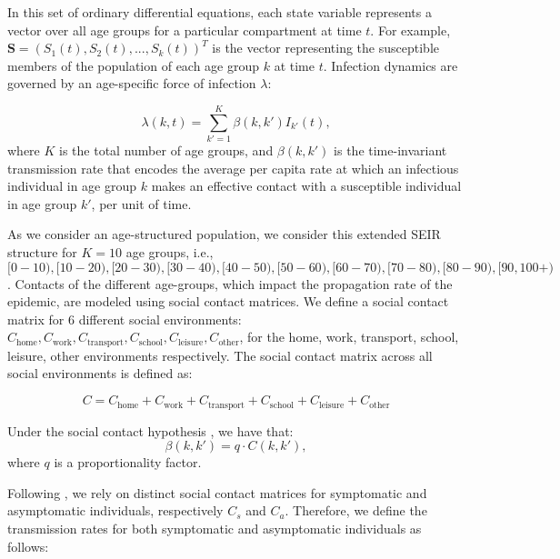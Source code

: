 \documentclass{article}
\renewcommand{\cite}[1]{\citep{#1}}
\newcommand{\foi}{\lambda}
\newcommand{\ctotal}{C}
\newcommand{\chome}{C_{\text{home}}}
\newcommand{\cwork}{C_{\text{work}}}
\newcommand{\ctransport}{C_{\text{transport}}}
\newcommand{\cschool}{C_{\text{school}}}
\newcommand{\cleisure}{C_{\text{leisure}}}
\newcommand{\cother}{C_{\text{other}}}
\newcommand{\proportionalityfactor}{q}
\newcommand{\agegroup}{k}
\newcommand{\agegroups}{K}
\begin{document}
In this set of ordinary differential equations, each state variable represents a vector over all age groups for a particular compartment at time $t$. For example, $\textbf{S} = (S_{1}(t), S_{2}(t), ..., S_{\agegroup}(t))^{T}$ is the vector representing the susceptible members of the population of each age group $\agegroup$ at time $t$. Infection dynamics are governed by an age-specific force of infection $\foi$:

\begin{equation}
    \foi(\agegroup,t) = \sum_{\agegroup'=1}^{\agegroups}\beta(\agegroup,\agegroup')I_{\agegroup'}(t),
\end{equation}
%
where $\agegroups$ is the total number of age groups, and $\beta(\agegroup,\agegroup')$ is the time-invariant transmission rate that encodes the average per capita rate at which an infectious individual in age group $\agegroup$ makes an effective contact with a susceptible individual in age group $\agegroup'$, per unit of time.

As we consider an age-structured population, we consider this extended SEIR structure for $\agegroups = 10$ age groups,  i.e., $[0-10), [10-20), [20-30), [30-40), [40-50), [50-60), [60-70), [70-80), [80-90), [90,100+)$. Contacts of the different age-groups, which impact the propagation rate of the epidemic, are modeled using social contact matrices. We define a social contact matrix for 6 different social environments: $\chome, \cwork, \ctransport, \cschool, \cleisure, \cother$, for the home, work, transport, school, leisure, other environments respectively. The social contact matrix across all social environments is defined as:

\begin{equation}
    \ctotal = \chome + \cwork + \ctransport + \cschool + \cleisure + \cother
\end{equation}

Under the social contact hypothesis \cite{wallinga2006using}, we have that:
%
\begin{equation}
\beta(\agegroup,\agegroup') = \proportionalityfactor \cdot \ctotal(\agegroup,\agegroup'),
\end{equation}
%
where $\proportionalityfactor$ is a proportionality factor.

Following \citet{abrams2021modelling}, we rely on distinct social contact matrices for symptomatic and asymptomatic individuals, respectively $\ctotal_{s}$ and $\ctotal_{a}$. Therefore, we define the transmission rates for both symptomatic and asymptomatic individuals as follows:
\end{document}
